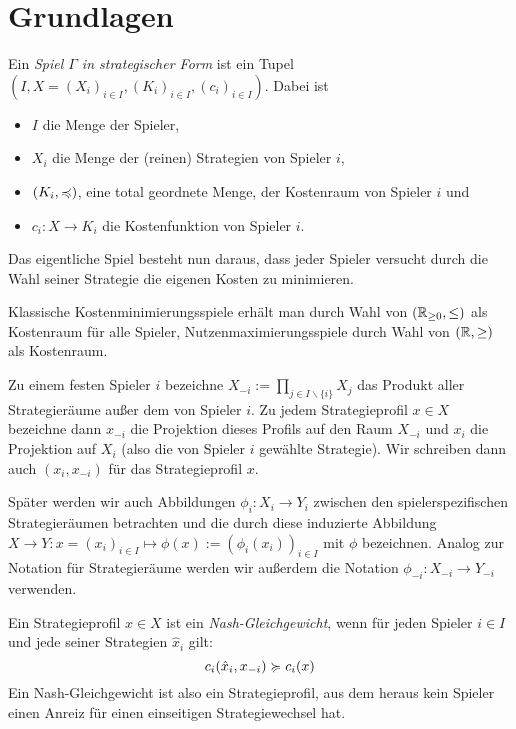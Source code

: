 \section{Grundlagen}\label{sec:Grundlagen}

\begin{defn}
	Ein \emph{Spiel $\Gamma$ in strategischer Form} ist ein Tupel $(I, X = (X_i)_{i \in I}, (K_i)_{i\in I}, (c_i)_{i\in I})$. Dabei ist
	\begin{itemize}
		\item $I$ die Menge der Spieler,
		\item $X_i$ die Menge der (reinen) Strategien von Spieler $i$,
		\item $(K_i, \preccurlyeq)$, eine total geordnete Menge, der Kostenraum von Spieler $i$ und
		\item $c_i: X \to K_i$ die Kostenfunktion von Spieler $i$.
	\end{itemize}
	Das eigentliche Spiel besteht nun daraus, dass jeder Spieler versucht durch die Wahl seiner Strategie die eigenen Kosten zu minimieren.
\end{defn}

\begin{beob}
	Klassische Kostenminimierungsspiele erhält man durch Wahl von $(\mathbb{R}_{\geq 0}, \leq)$ als Kostenraum für alle Spieler, Nutzenmaximierungsspiele durch Wahl von $(\mathbb{R}, \geq)$ als \glqq Kosten\grqq raum.
\end{beob}

\begin{notation}
	Zu einem festen Spieler $i$ bezeichne $X_{-i} := \prod_{j \in I\backslash\{i\}} X_j$ das Produkt aller Strategieräume außer dem von Spieler $i$. Zu jedem Strategieprofil $x \in X$ bezeichne dann $x_{-i}$ die Projektion dieses Profils auf den Raum $X_{-i}$ und $x_i$ die Projektion auf $X_i$ (also die von Spieler $i$ gewählte Strategie). Wir schreiben dann auch $(x_i, x_{-i})$ für das Strategieprofil $x$.
	
	Später werden wir auch Abbildungen $\phi_i: X_i \to Y_i$ zwischen den spielerspezifischen Strategieräumen betrachten und die durch diese induzierte Abbildung $X \to Y: x = (x_i)_{i \in I} \mapsto \phi(x) := (\phi_i(x_i))_{i \in I}$ mit $\phi$ bezeichnen. Analog zur Notation für Strategieräume werden wir außerdem die Notation $\phi_{-i}: X_{-i} \to Y_{-i}$ verwenden.
\end{notation}

\begin{defn}
	Ein Strategieprofil $x \in X$ ist ein \emph{Nash-Gleichgewicht}, wenn für jeden Spieler $i \in I$ und jede seiner Strategien $\hat{x}_i$ gilt:
		\[c_i(\hat{x}_i, x_{-i}) \succcurlyeq c_i(x)\]
	Ein Nash-Gleichgewicht ist also ein Strategieprofil, aus dem heraus kein Spieler einen Anreiz für einen einseitigen Strategiewechsel hat.	
\end{defn}

